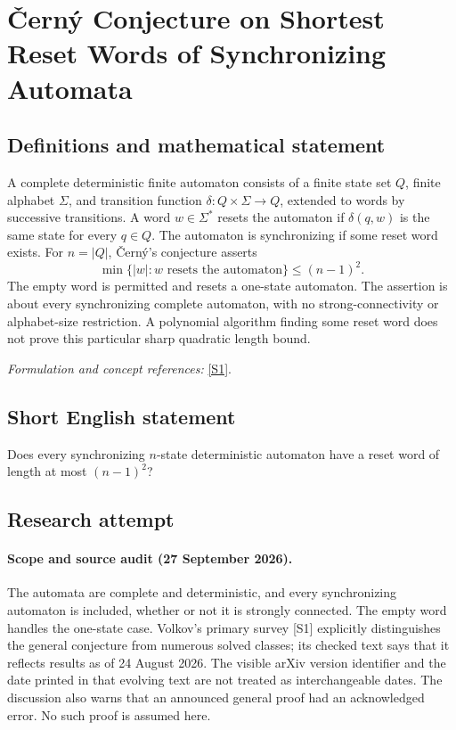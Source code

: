 \documentclass[11pt]{article}
\begin{document}
\section*{\texorpdfstring{Černý Conjecture on Shortest Reset Words of Synchronizing Automata}{Černý Conjecture on Shortest Reset Words of Synchronizing Automata}}\label{statement}
\subsection{Definitions and mathematical statement}
A complete deterministic finite automaton consists of a finite state set $Q$, finite alphabet $\Sigma$, and transition function $\delta:Q\times\Sigma\to Q$, extended to words by successive transitions. A word $w\in\Sigma^*$ resets the automaton if $\delta(q,w)$ is the same state for every $q\in Q$. The automaton is synchronizing if some reset word exists. For $n=|Q|$, \v{C}ern\'y's conjecture asserts
\[
 \min\{|w|:w\text{ resets the automaton}\}\le(n-1)^2.
\]
The empty word is permitted and resets a one-state automaton. The assertion is about every synchronizing complete automaton, with no strong-connectivity or alphabet-size restriction. A polynomial algorithm finding some reset word does not prove this particular sharp quadratic length bound.
\par\smallskip\textit{Formulation and concept references:} \href{https://arxiv.org/html/2508.15655}{[S1]}.

\subsection{Short English statement}
Does every synchronizing $n$-state deterministic automaton have a reset word of length at most $(n-1)^2$?
\subsection{Research attempt}
\paragraph{Scope and source audit (27 September 2026).}
The automata are complete and deterministic, and every synchronizing automaton is included, whether or not it is strongly connected. The empty word handles the one-state case. Volkov's primary survey [S1] explicitly distinguishes the general conjecture from numerous solved classes; its checked text says that it reflects results as of 24 August 2026. The visible arXiv version identifier and the date printed in that evolving text are not treated as interchangeable dates. The discussion also warns that an announced general proof had an acknowledged error. No such proof is assumed here.
\end{document}
